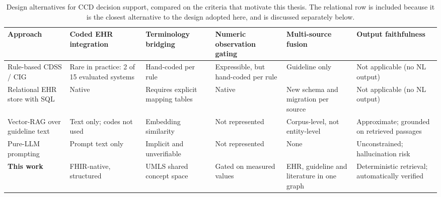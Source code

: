 \begin{table}[h]
\centering
\caption{Design alternatives for CCD decision support, compared on the criteria that
motivate this thesis. The relational row is included because it is the closest alternative
to the design adopted here, and is discussed separately below.}
\label{tab:method-comparison}
\footnotesize
\setlength{\tabcolsep}{3pt}
\begin{tabular}{p{2.0cm}p{2.28cm}p{2.28cm}p{2.28cm}p{2.28cm}p{2.28cm}}
\hline
\textbf{Approach} & \textbf{Coded EHR integration} & \textbf{Terminology bridging} &
\textbf{Numeric observation gating} & \textbf{Multi-source fusion} &
\textbf{Output faithfulness} \\
\hline
Rule-based CDSS / CIG &
Rare in practice: 2 of 15 evaluated systems \cite{papadopoulos2022} &
Hand-coded per rule &
Expressible, but hand-coded per rule &
Guideline only &
Not applicable (no NL output) \\
Relational EHR store with SQL &
Native &
Requires explicit mapping tables &
Native &
New schema and migration per source &
Not applicable (no NL output) \\
Vector-RAG over guideline text &
Text only; codes not used &
Embedding similarity &
Not represented &
Corpus-level, not entity-level &
Approximate; grounded on retrieved passages \\
Pure-LLM prompting &
Prompt text only &
Implicit and unverifiable &
Not represented &
None &
Unconstrained; hallucination risk \\
\textbf{This work} &
FHIR-native, structured &
UMLS shared concept space &
Gated on measured values &
EHR, guideline and literature in one graph &
Deterministic retrieval; automatically verified \\
\hline
\end{tabular}
\end{table}

